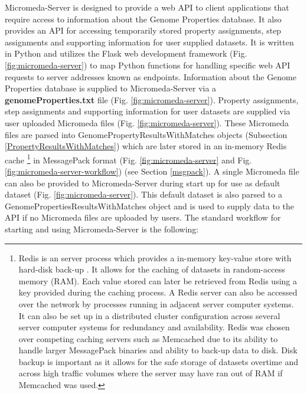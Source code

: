 Micromeda-Server is designed to provide a web API to client applications that require access to information about the Genome Properties database. It also provides an API for accessing temporarily stored property assignments, step assignments and supporting information for user supplied datasets. It is written in Python and utilizes the Flask web development framework \cite{grinberg2018flask} (Fig. \ref{fig:micromeda-server}) to map Python functions for handling specific web API requests to server addresses known as endpoints. Information about the Genome Properties database is supplied to Micromeda-Server via a \textbf{genomeProperties.txt} file (Fig. \ref{fig:micromeda-server}). Property assignments, step assignments and supporting information for user datasets are supplied via user uploaded Micromeda files (Fig. \ref{fig:micromeda-server}). These Micromeda files are parsed into GenomePropertyResultsWithMatches objects (Subsection \ref{PropertyResultsWithMatches}) which are later stored in an in-memory Redis cache \footnote{Redis is an server process which provides a in-memory key-value store with hard-disk back-up  \cite{han2011survey}. It allows for the caching of datasets in random-access memory (RAM). Each value stored can later be retrieved from Redis using a key provided during the caching process. A Redis server can also be accessed over the network by processes running in adjacent server computer systems. It can also be set up in a distributed cluster configuration across several server computer systems for redundancy and availability. Redis was chosen over competing caching servers such as Memcached \cite{fitzpatrick2004distributed} due to its ability to handle larger MessagePack binaries \cite{furuhashi2013messagepack} and ability to back-up data to disk. Disk backup is important as it allows for the safe storage of datasets overtime and across high traffic volumes where the server may have ran out of RAM if Memcached was used.} in MessagePack format \cite{furuhashi2013messagepack} (Fig. \ref{fig:micromeda-server} and Fig. \ref{fig:micromeda-server-workflow}) (see Section \ref{msgpack}). A single Micromeda file can also be provided to Micromeda-Server during start up for use as default dataset (Fig. \ref{fig:micromeda-server}). This default dataset is also parsed to a GenomePropertiesResultsWithMatches object and is used to supply data to the API if no Micromeda files are uploaded by users. The standard workflow for starting and using Micromeda-Server is the following:

